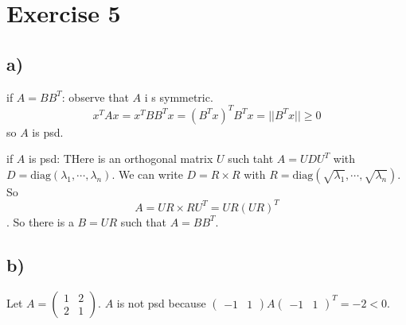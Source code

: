 \section*{Exercise 5}
\subsection*{a)}

if $A = BB^T$:
observe that $A$ i s symmetric.
 \[x^TAx = x^TBB^Tx = (B^Tx)^TB^Tx = ||B^Tx|| \ge 0\]
 so $A$ is psd.
 
 
if $A$ is psd:
THere is an orthogonal matrix $U$ such taht $A=UDU^T$ with $D=\text{diag}(\lambda_1,\cdots,\lambda_n)$.
We can write $D=R\times R$ with $R=\text{diag}(\sqrt{\lambda_1},\cdots,\sqrt{\lambda_n})$.
So \[A=UR\times RU^T = UR(UR)^T\].
So there is a $B = UR$ such that $A = BB^T$.

\subsection*{b)}
Let $A = \left(\begin{matrix}
1&2\\2&1
\end{matrix}\right)$.
$A$ is not psd because $\left(\begin{matrix}
-1 & 1
\end{matrix}\right)A\left(\begin{matrix}
-1 & 1
\end{matrix}\right)^T = -2 < 0$.
